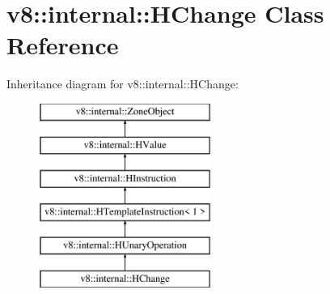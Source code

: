 \hypertarget{classv8_1_1internal_1_1_h_change}{}\section{v8\+:\+:internal\+:\+:H\+Change Class Reference}
\label{classv8_1_1internal_1_1_h_change}
Inheritance diagram for v8\+:\+:internal\+:\+:H\+Change\+:\begin{figure}[H]
\begin{center}
\leavevmode
\includegraphics[height=6.000000cm]{classv8_1_1internal_1_1_h_change}
\end{center}
\end{figure}
